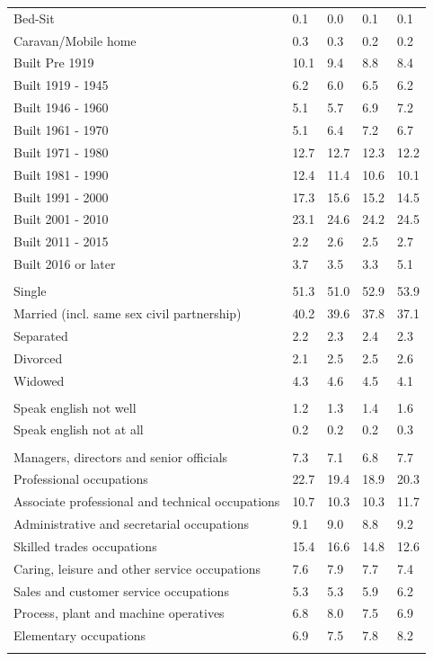 \documentclass{article}
\begin{document}
\begin{table}[h]
\begin{tabular}{KTTTT}
Bed-Sit & 0.1& 0.0& 0.1& 0.1\\
Caravan/Mobile home & 0.3& 0.3& 0.2& 0.2\\
    \hline
Built Pre 1919 & 10.1&  9.4&  8.8&  8.4\\
Built 1919 - 1945 & 6.2& 6.0& 6.5& 6.2\\
Built  1946 - 1960 & 5.1& 5.7& 6.9& 7.2\\
Built  1961 - 1970 & 5.1& 6.4& 7.2& 6.7\\
Built  1971 - 1980 & 12.7& 12.7& 12.3& 12.2\\
Built  1981 - 1990 & 12.4& 11.4& 10.6& 10.1\\
Built  1991 - 2000 & 17.3& 15.6& 15.2& 14.5\\
Built  2001 - 2010 & 23.1& 24.6& 24.2& 24.5\\
Built  2011 - 2015 & 2.2& 2.6& 2.5& 2.7\\
Built  2016 or later & 3.7& 3.5& 3.3& 5.1\\
\hline
    \\
    \hline
Single & 51.3& 51.0& 52.9& 53.9\\
Married (incl. same sex civil partnership) & 40.2& 39.6& 37.8& 37.1\\
Separated  & 2.2& 2.3& 2.4& 2.3\\
Divorced  & 2.1& 2.5& 2.5& 2.6\\
Widowed & 4.3& 4.6& 4.5& 4.1\\
\hline
    \\ 
    \hline
Speak english not well & 1.2& 1.3& 1.4& 1.6\\
Speak english not at all & 0.2& 0.2& 0.2& 0.3\\
\hline
    \\
    \hline
Managers, directors and senior officials & 7.3& 7.1& 6.8& 7.7\\
Professional occupations & 22.7& 19.4& 18.9& 20.3\\
Associate professional and technical occupations & 10.7& 10.3& 10.3& 11.7\\
Administrative and secretarial occupations & 9.1& 9.0& 8.8& 9.2\\
Skilled trades occupations & 15.4& 16.6& 14.8& 12.6\\
Caring, leisure and other service occupations & 7.6& 7.9& 7.7& 7.4\\
Sales and customer service occupations & 5.3& 5.3& 5.9& 6.2\\
Process, plant and machine operatives & 6.8& 8.0& 7.5& 6.9\\
Elementary occupations & 6.9& 7.5& 7.8& 8.2\\
\hline
\end{tabular}
\end{table}
\end{document}
